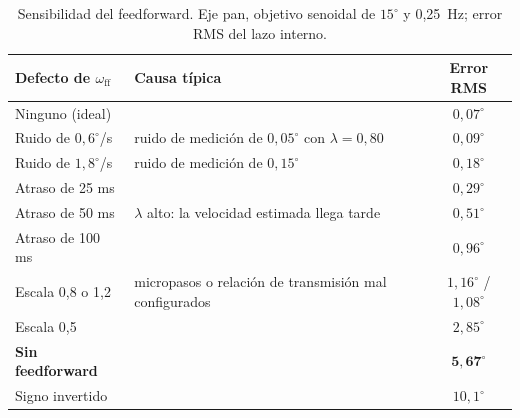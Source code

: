 \documentclass[11pt,a4paper]{article}
\newcommand{\lam}{\lambda}
\newcommand{\gr}{^{\circ}}
\begin{document}
\begin{table}[H]
\centering\small
\caption{Sensibilidad del feedforward. Eje pan, objetivo senoidal de $15\gr$ y 0,25~Hz; error RMS del lazo interno.}
\label{tab:sens}
\begin{tabular}{@{}llc@{}}
\toprule
Defecto de $\omega_{\mathrm{ff}}$ & Causa típica & Error RMS \\
\midrule
Ninguno (ideal) & & $0{,}07\gr$ \\
Ruido de $0{,}6\gr$/s & ruido de medición de $0{,}05\gr$ con $\lam = 0{,}80$ & $0{,}09\gr$ \\
Ruido de $1{,}8\gr$/s & ruido de medición de $0{,}15\gr$ & $0{,}18\gr$ \\
Atraso de 25 ms & & $0{,}29\gr$ \\
Atraso de 50 ms & $\lam$ alto: la velocidad estimada llega tarde & $0{,}51\gr$ \\
Atraso de 100 ms & & $0{,}96\gr$ \\
Escala 0,8 o 1,2 & micropasos o relación de transmisión mal configurados & $1{,}16\gr$ / $1{,}08\gr$ \\
Escala 0,5 & & $2{,}85\gr$ \\
\textbf{Sin feedforward} & & $\mathbf{5{,}67\gr}$ \\
Signo invertido & & $10{,}1\gr$ \\
\bottomrule
\end{tabular}
\end{table}
\end{document}
